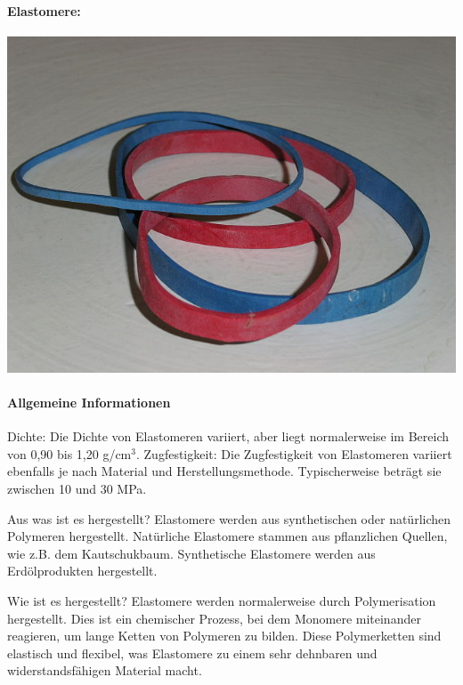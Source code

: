 \documentclass{article}
\begin{document}
\newpage
\pagestyle{fancy}
\fancyhf{}

\begin{multicols}{3}

\paragraph{Elastomere:}
\includegraphics[width=\linewidth]{elasto.jpeg}

\paragraph{Allgemeine Informationen}
Dichte: Die Dichte von Elastomeren variiert, aber liegt normalerweise im Bereich von 0,90 bis 1,20 g/cm$^3$.
Zugfestigkeit: Die Zugfestigkeit von Elastomeren variiert ebenfalls je nach Material und Herstellungsmethode. Typischerweise beträgt sie zwischen 10 und 30 MPa.

Aus was ist es hergestellt?
Elastomere werden aus synthetischen oder natürlichen Polymeren hergestellt. Natürliche Elastomere stammen aus pflanzlichen Quellen, wie z.B. dem Kautschukbaum. Synthetische Elastomere werden aus Erdölprodukten hergestellt.

Wie ist es hergestellt?
Elastomere werden normalerweise durch Polymerisation hergestellt. Dies ist ein chemischer Prozess, bei dem Monomere miteinander reagieren, um lange Ketten von Polymeren zu bilden. Diese Polymerketten sind elastisch und flexibel, was Elastomere zu einem sehr dehnbaren und widerstandsfähigen Material macht.


\end{multicols}
\end{document}
